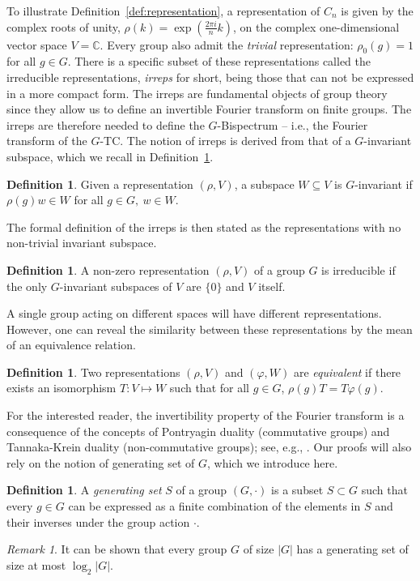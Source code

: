 \documentclass{article}
\theoremstyle{plain}
\theoremstyle{definition}
\newtheorem{definition}[theorem]{Definition}
\theoremstyle{remark}
\newtheorem{remark}[theorem]{Remark}
\begin{document}
To illustrate Definition~\ref{def:representation}, a representation of $C_n$ is given by the complex roots of unity, $\rho(k) = \exp\left(\frac{2\pi i }{n}k\right)$, on the complex one-dimensional vector space $V= \mathbb{C}$. Every group also admit the \emph{trivial} representation: $\rho_0(g)=1$ for all $g \in G$. There is a specific subset of these representations called the irreducible representations, \emph{irreps} for short, being those that can not be expressed in a more compact form. The irreps are fundamental objects of group theory since they allow us to define an invertible Fourier transform on finite groups. The irreps are therefore needed to define the $G$-Bispectrum -- i.e., the Fourier transform of the $G$-TC. The notion of irreps is derived from that of a $G$-invariant subspace, which we recall in Definition~\ref{def:invariantspace}.
\begin{definition}\label{def:invariantspace}
    Given a representation $(\rho, V)$, a subspace $W\subseteq V$ is $G$-invariant if $\rho(g)w\in W$ for all $g\in G,\ w\in W$.
\end{definition}
The formal definition of the irreps is then stated as the representations with no non-trivial invariant subspace.
\begin{definition}
    A non-zero representation $(\rho,V)$ of a group $G$ is irreducible if the only $G$-invariant subspaces of $V$ are $\{0\}$ and $V$ itself.
\end{definition}
A single group acting on different spaces will have different representations. However, one can reveal the similarity between these representations by the mean of an equivalence relation.
\begin{definition}\label{def:equivalence}
    Two representations $(\rho,V)$ and $(\varphi, W)$ are \emph{equivalent} if there exists an isomorphism $T:V\mapsto W$ such that for all $g\in G$, $\rho(g) T = T \varphi(g)$.
\end{definition}
For the interested reader, the invertibility property of the Fourier transform is a consequence of the concepts of Pontryagin duality (commutative groups) and Tannaka-Krein duality (non-commutative groups); see, e.g., \citep{joyal_ross_tannaka}.
Our proofs will also rely on the notion of generating set of $G$, which we introduce here.
\begin{definition}
    A \emph{generating set} $S$ of a group $(G, \cdot)$ is a subset $S\subset G$ such that every $g\in G$ can be expressed as a finite combination of the elements in $S$ and their inverses under the group action $\cdot$.
\end{definition}
\begin{remark}
    It can be shown that every group $G$ of size $|G|$ has a generating set of size at most $\log_2 |G|$.
\end{remark}
\end{document}
